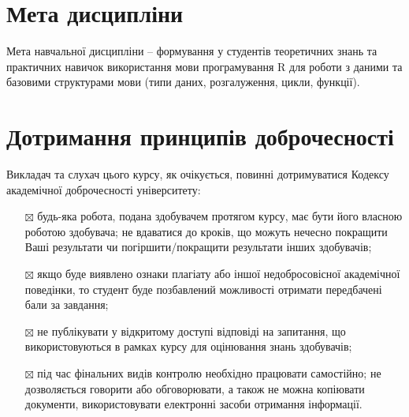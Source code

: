 \documentclass[
  letterpaper,
  DIV=11,
  numbers=noendperiod]{scrreprt}
\begin{document}
\hypertarget{ux43cux435ux442ux430-ux434ux438ux441ux446ux438ux43fux43bux456ux43dux438}{%
\section*{Мета
дисципліни}\label{ux43cux435ux442ux430-ux434ux438ux441ux446ux438ux43fux43bux456ux43dux438}}

Мета навчальної дисципліни -- формування у студентів теоретичних знань
та практичних навичок використання мови програмування R для роботи з
даними та базовими структурами мови (типи даних, розгалуження, цикли,
функції).

\hypertarget{ux434ux43eux442ux440ux438ux43cux430ux43dux43dux44f-ux43fux440ux438ux43dux446ux438ux43fux456ux432-ux434ux43eux431ux440ux43eux447ux435ux441ux43dux43eux441ux442ux456}{%
\section*{Дотримання принципів
доброчесності}\label{ux434ux43eux442ux440ux438ux43cux430ux43dux43dux44f-ux43fux440ux438ux43dux446ux438ux43fux456ux432-ux434ux43eux431ux440ux43eux447ux435ux441ux43dux43eux441ux442ux456}}

Викладач та слухач цього курсу, як очікується, повинні дотримуватися
Кодексу академічної доброчесності університету:

\begin{itemize}
\item[$\boxtimes$]
  будь-яка робота, подана здобувачем протягом курсу, має бути його
  власною роботою здобувача; не вдаватися до кроків, що можуть нечесно
  покращити Ваші результати чи погіршити/покращити результати інших
  здобувачів;
\item[$\boxtimes$]
  якщо буде виявлено ознаки плагіату або іншої недобросовісної
  академічної поведінки, то студент буде позбавлений можливості отримати
  передбачені бали за завдання;
\item[$\boxtimes$]
  не публікувати у відкритому доступі відповіді на запитання, що
  використовуються в рамках курсу для оцінювання знань здобувачів;
\item[$\boxtimes$]
  під час фінальних видів контролю необхідно працювати самостійно; не
  дозволяється говорити або обговорювати, а також не можна копіювати
  документи, використовувати електронні засоби отримання інформації.
\end{itemize}
\end{document}
